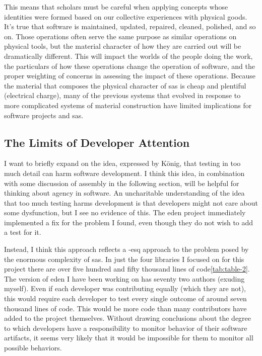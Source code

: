 \documentclass[a4paper,man,natbib,floatsintext]{apa6}
\begin{document}
   This means that scholars must be careful when applying concepts whose identities were formed based on our collective experiences with physical goods. It's true that software is maintained, updated, repaired, cleaned, polished, and so on. Those operations often serve the same purpose as similar operations on physical tools, but the material character of how they are carried out will be dramatically different. This will impact the worlds of the people doing the work, the particulars of how these operations change the operation of software, and the proper weighting of concerns in assessing the impact of these operations. Because the material that composes the physical character of \glspl{sa} is cheap and plentiful (electrical charge), many of the previous systems that evolved in response to more complicated systems of material construction have limited implications for software projects and \glspl{sa}.

   \subsection{The Limits of Developer Attention}
   I want to briefly expand on the idea, expressed by K{\"o}nig, that testing in too much detail can harm software development. I think this idea, in combination with some discussion of assembly in the following section, will be helpful for thinking about agency in software. An uncharitable understanding of the idea that too much testing harms development is that developers might not care about some dysfunction, but I see no evidence of this. The \acrshort{eden} project immediately implemented a fix for the problem I found, even though they do not wish to add a test for it. 

   Instead, I think this approach reflects a \citet{Citton2017-xq}-esq approach to the problem posed by the enormous complexity of \glspl{sa}. In just the four libraries I focused on for this project there are over five hundred and fifty thousand lines of code\ref{tab:table-2}. The version of \acrshort{eden} I have been working on has seventy two authors (exuding myself). Even if each developer was contributing equally (which they are not), this would require each developer to test every single outcome of around seven thousand lines of code. This would be more code than many contributors have added to the project themselves. Without drawing conclusions about the degree to which developers have a responsibility to monitor behavior of their software artifacts, it seems very likely that it would be impossible for them to monitor all possible behaviors.
\end{document}
